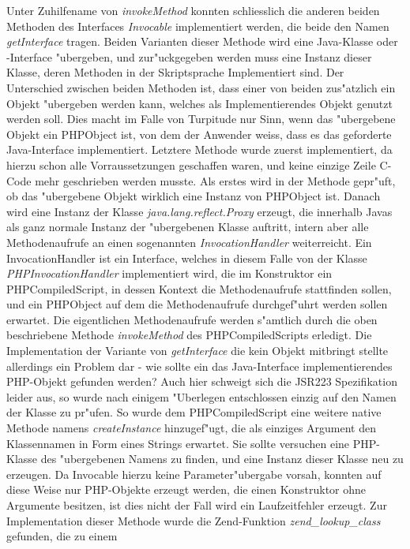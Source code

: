 Unter Zuhilfename von \emph{invokeMethod} konnten schliesslich die anderen beiden Methoden des Interfaces \emph{Invocable} implementiert werden, die beide
den Namen \emph{getInterface} tragen. Beiden Varianten dieser Methode wird eine Java-Klasse oder -Interface "ubergeben, und zur"uckgegeben werden muss eine 
Instanz dieser Klasse, deren Methoden in der Skriptsprache Implementiert sind. Der Unterschied zwischen beiden Methoden ist, dass einer von beiden 
zus"atzlich ein Objekt "ubergeben werden kann, welches als Implementierendes Objekt genutzt werden soll. Dies macht im Falle von Turpitude nur Sinn, wenn das 
"ubergebene Objekt ein PHPObject ist, von dem der Anwender weiss, dass es das geforderte Java-Interface implementiert. Letztere Methode wurde zuerst implementiert,
da hierzu schon alle Vorraussetzungen geschaffen waren, und keine einzige Zeile C-Code mehr geschrieben werden musste. Als erstes wird in der Methode gepr"uft, ob
das "ubergebene Objekt wirklich eine Instanz von PHPObject ist. Danach wird eine Instanz der Klasse \emph{java.lang.reflect.Proxy} erzeugt, die innerhalb Javas
als ganz normale Instanz der "ubergebenen Klasse auftritt, intern aber alle Methodenaufrufe an einen sogenannten \emph{InvocationHandler} weiterreicht.
Ein InvocationHandler ist ein Interface, welches in diesem Falle von der Klasse \emph{PHPInvocationHandler} implementiert wird, die im Konstruktor
ein PHPCompiledScript, in dessen Kontext die Methodenaufrufe stattfinden sollen, und ein PHPObject auf dem die Methodenaufrufe durchgef"uhrt werden sollen erwartet.
Die eigentlichen Methodenaufrufe werden s"amtlich durch die oben beschriebene Methode \emph{invokeMethod} des PHPCompiledScripts erledigt.
Die Implementation der Variante von \emph{getInterface} die kein Objekt mitbringt stellte allerdings ein Problem dar - wie sollte ein das Java-Interface implementierendes
PHP-Objekt gefunden werden? Auch hier schweigt sich die JSR223 Spezifikation leider aus, so wurde nach einigem "Uberlegen entschlossen einzig auf den Namen der Klasse zu
pr"ufen. So wurde dem PHPCompiledScript eine weitere native Methode namens \emph{createInstance} hinzugef"ugt, die als einziges Argument den 
Klassennamen in Form eines Strings erwartet. Sie sollte versuchen eine PHP-Klasse des "ubergebenen Namens zu finden, und eine Instanz dieser Klasse neu zu erzeugen.
Da Invocable hierzu keine Parameter"ubergabe vorsah, konnten auf diese Weise nur PHP-Objekte erzeugt werden, die einen Konstruktor ohne Argumente besitzen, ist 
dies nicht der Fall wird ein Laufzeitfehler erzeugt. Zur Implementation dieser Methode wurde die Zend-Funktion \emph{zend\_lookup\_class} gefunden, die zu einem
